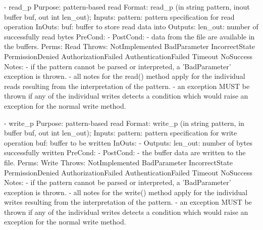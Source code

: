 \begin{myspec}
 
    - read_p
      Purpose:  pattern-based read
      Format:   read_p             (in    string      pattern, 
                                    inout buffer      buf,
                                    out   int         len_out); 
      Inputs:   pattern:            pattern specification for
                                    read operation
      InOuts:   buf:                buffer to store read data
                                    into
      Outputs:  len_out:            number of successfully read
                                    bytes
      PreCond:  -
      PostCond: - data from the file are available in the
                  buffers.
      Perms:    Read
      Throws:   NotImplemented
                BadParameter
                IncorrectState
                PermissionDenied
                AuthorizationFailed
                AuthenticationFailed
                Timeout
                NoSuccess
      Notes:    - if the pattern cannot be parsed or interpreted,
                  a 'BadParameter' exception is thrown.
                - all notes for the read() method apply for the
                  individual reads resulting from the
                  interpretation of the pattern.
                - an exception MUST be thrown if any of the
                  individual writes detects a condition which
                  would raise an exception for the normal write
                  method.
 
 
    - write_p
      Purpose:  pattern-based read
      Format:   write_p            (in    string      pattern, 
                                    in    buffer      buf, 
                                    out   int         len_out); 
      Inputs:   pattern:            pattern specification for
                                    write operation
                buf:                buffer to be written
      InOuts:   -
      Outputs:  len_out:            number of bytes successfully
                                    written
      PreCond:  -
      PostCond: - the buffer data are written to the file.
      Perms:    Write
      Throws:   NotImplemented
                BadParameter
                IncorrectState
                PermissionDenied
                AuthorizationFailed
                AuthenticationFailed
                Timeout
                NoSuccess
      Notes:    - if the pattern cannot be parsed or interpreted,
                  a 'BadParameter' exception is thrown.
                - all notes for the write() method apply for the
                  individual writes resulting from the
                  interpretation of the pattern.
                - an exception MUST be thrown if any of the
                  individual writes detects a condition which
                  would raise an exception for the normal write
                  method.
 

\end{myspec}
